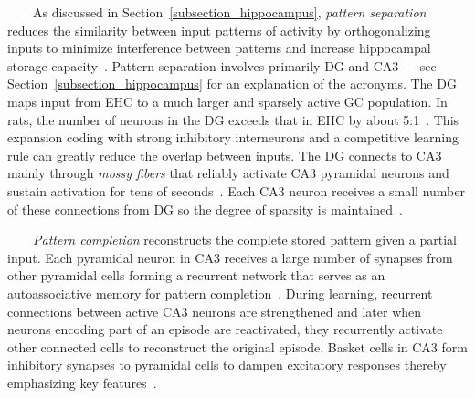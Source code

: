 \documentclass[letterpaper,11pt]{article}
\def\emdash{---}
\begin{document}







\begin{center}
  \begin{tcolorbox}[breakable,sharp corners=all,coltitle=black,colbacktitle=white,
    width=\textwidth,boxsep=5pt,left=5pt,right=5pt,
    title={\textbf{Box A: Pattern Separation, Completion and Integration}}]

~~~~As discussed in Section~\ref{subsection_hippocampus}, {\it{pattern separation}} reduces the similarity between input patterns of activity by orthogonalizing inputs to minimize interference between patterns and increase hippocampal storage capacity~\cite{KesnerandRollsNBR-15}. Pattern separation involves primarily DG and CA3 {\emdash{}} see Section~\ref{subsection_hippocampus} for an explanation of the acronyms. The DG maps input from EHC to a much larger and sparsely active GC population. In rats, the number of neurons in the DG exceeds that in EHC by about 5:1~\cite{DrewetalLEARNING-MEMORY-13}. This expansion coding with strong inhibitory interneurons and a competitive learning rule can greatly reduce the overlap between inputs. The DG connects to CA3 mainly through {\it{mossy fibers}} that reliably activate CA3 pyramidal neurons and sustain activation for tens of seconds~\cite{VyletaetalELIFE-16}. Each CA3 neuron receives a small number of these connections from DG so the degree of sparsity is maintained~\cite{KesnerandRollsNBR-15}.

~~~~{\it{Pattern completion}} reconstructs the complete stored pattern given a partial input. Each pyramidal neuron in CA3 receives a large number of synapses from other pyramidal cells forming a recurrent network that serves as an autoassociative memory for pattern completion~\cite{KesnerandRollsNBR-15}. During learning, recurrent connections between active CA3 neurons are strengthened and later when neurons encoding part of an episode are reactivated, they recurrently activate other connected cells to reconstruct the original episode. Basket cells in CA3 form inhibitory synapses to pyramidal cells to dampen excitatory responses thereby emphasizing key features~\cite{NeunuebelandKnierimNEURON-14}. 


\end{tcolorbox}
\end{center}
\end{document}
